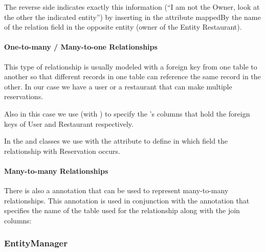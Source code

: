 The reverse side indicates exactly this information (``I am not the Owner, look
at the other the indicated entity'') by inserting in the attribute mappedBy the
name of the relation field in the opposite entity (owner of the Entity
Restaurant).

\paragraph{One-to-many / Many-to-one Relationships}

This type of relationship is usually modeled with a foreign key from one table
to another so that different records in one table can reference the same record
in the other. In our case we have a user or a restaurant that can make multiple
reservations.





Also in this case we use  (with ) to specify
the 's columns that hold the foreign keys of User and
Restaurant respectively.

In the  and  classes we use  with
the  attribute to define in which field the relationship with
Reservation occurs.

\paragraph{Many-to-many Relationships}

There is also a  annotation that can be used to represent
many-to-many relationships. This annotation is used in conjunction with the
 annotation that specifies the name of the table used for the
relationship along with the join columns:



\subsubsection{EntityManager}

